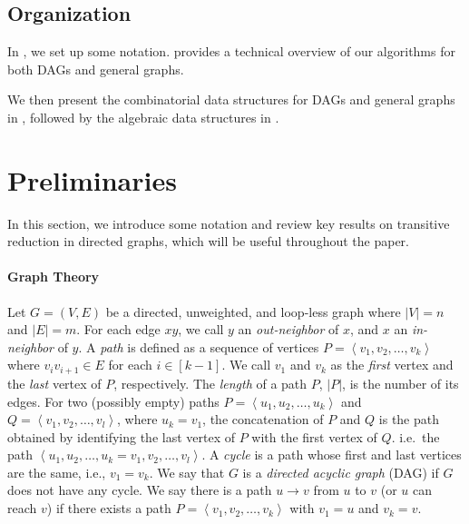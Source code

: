 \documentclass[11pt]{article}
\newcommand{\arxivVsConference}[2]{#1}
\begin{document}
\subsection{Organization}
In , we set up some notation.  provides a technical overview of our algorithms for both DAGs and general graphs.
\arxivVsConference{}{
We then present the simpler data structures for DAGs in \Cref{sec:reduction,subsec:combinatorial_dag}. Due to space constraints, the detailed description of our data structures for general graphs, together with some proofs, is deferred to the appendix.
}
\arxivVsConference{
We then present the combinatorial data structures for DAGs and general graphs in \Cref{sec:combinatorial}, 
followed by the algebraic data structures in \Cref{sec:algebraic}.
}{}


 
\section{Preliminaries}\label{sec:prelims}
In this section, we introduce some notation and review key results on transitive reduction in directed graphs, which will be useful throughout the paper. 

\paragraph*{Graph Theory}
Let \( G = (V, E) \) be a directed, unweighted, and loop-less graph where \( |V| = n \) and \( |E| = m \).
For each edge \( xy \), we call \( y \) an \textit{out-neighbor} of \( x \), and \( x \) an \textit{in-neighbor} of \( y \).
A \textit{path} is defined as a sequence of vertices \( P =  \left\langle v_1, v_2, \dots , v_k \right\rangle \) where \( v_i v_{i+1} \in E \) for each \( i \in [k-1] \).
We call \( v_1 \) and \( v_k \) as the \textit{first} vertex and the \textit{last} vertex of \( P \), respectively.
The \textit{length} of a path \( P \), \( |P| \), is the number of its edges.
For two (possibly empty) paths \( P = \left\langle u_1, u_2, \dots , u_k \right\rangle \) and \( Q = \left\langle v_1, v_2, \dots , v_l \right\rangle \), where \( u_k = v_1 \), the concatenation of \( P \) and \( Q \) is the path obtained by identifying the last vertex of \( P \) with the first vertex of \( Q \).
i.e.\ the path \( \left\langle u_1, u_2, \dots , u_k = v_1, v_2, \dots , v_l \right\rangle \).
A \textit{cycle} is a path whose first and last vertices are the same, i.e., \( v_1 = v_k \).
We say that \( G \) is a \textit{directed acyclic graph} (DAG) if \( G \) does not have any cycle.
We say there is a path \( u \rightarrow v \) from \( u \) to \( v \) (or \( u \) can reach \( v \)) if there exists a path \( P = \left\langle v_1, v_2, \dots , v_k \right\rangle \) with \( v_1 = u \) and \( v_k = v \).
\end{document}
